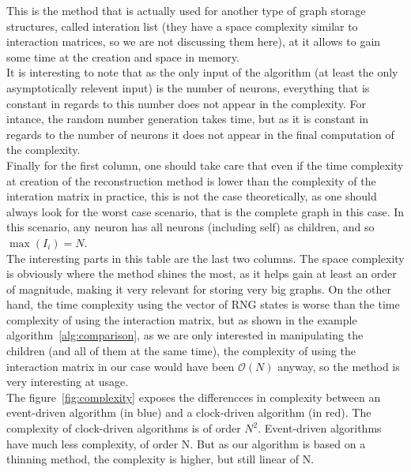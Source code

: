 \documentclass{article}
\begin{document}
		This is the method that is actually used for another type of graph storage structures, called interation list (they have a space complexity similar to interaction matrices, so we are not discussing them here), at it allows to gain some time at the creation and space in memory.\\\indent
		It is interesting to note that as the only input of the algorithm (at least the only asymptotically relevent input) is the number of neurons, everything that is constant in regards to this number does not appear in the complexity. For intance, the random number generation takes time, but as it is constant in regards to the number of neurons it does not appear in the final computation of the complexity.\\\indent
		Finally for the first column, one should take care that even if the time complexity at creation of the reconstruction method is lower than the complexity of the interation matrix in practice, this is not the case theoretically, as one should always look for the worst case scenario, that is the complete graph in this case. In this scenario, any neuron has all neurons (including self) as children, and so $\max(I_i)=N$.\\\indent
		The interesting parts in this table are the last two columns. The space complexity is obviously where the method shines the most, as it helps gain at least an order of magnitude, making it very relevant for storing very big graphs. On the other hand, the time complexity using the vector of RNG states is worse than the time complexity of using the interaction matrix, but as shown in the example algorithm~\ref{alg:comparison}, as we are only interested in manipulating the children (and all of them at the same time), the complexity of using the interaction matrix in our case would have been $\mathscr{O}(N)$ anyway, so the method is very interesting at usage.\\\indent
		The figure~\ref{fig:complexity} exposes the differencces in complexity between an event-driven algorithm (in blue) and a clock-driven algorithm (in red). 
		The complexity of clock-driven algorithms is of order $N^2$. Event-driven algorithms have much less complexity, of order N. But as our algorithm is based on a thinning method, the complexity is higher, but still linear of N.\\
\end{document}
